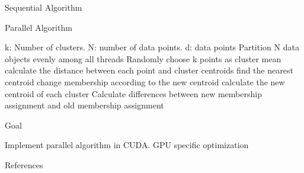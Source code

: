 \documentclass[
nopagebreaks,
style=klope,
fleqn]{powerdot}
\begin{document}
\begin{slide} {Sequential Algorithm}
\begin{figure}[h]
  \end{figure}
\end{slide}

\begin{slide} {Parallel Algorithm}
  \footnotesize
  \begin{algorithmic}[1]
    \INPUT k: Number of clusters. N: number of data points. d: data points
     \label{alg:p}
    \State Partition N data objects evenly among all threads
    \State Randomly choose k points as cluster mean
    \State calculate the distance between each point and
    cluster centroids
    \State find the nearest centroid
    \State change membership according to the new centroid
    \State calculate the new centroid of each cluster
    \EndParFor
    \State Calculate differences between new membership assignment and
    old membership assignment
    \EndWhile
    \EndFunction  
  \end{algorithmic}
\end{slide}

\begin{slide}{Goal}
  \begin{compactitem}
    \item{Implement parallel algorithm in CUDA. GPU specific optimization}
  \end{compactitem}
\end{slide}

\begin{slide} {References}
\footnotesize


\end{slide}
\end{document}
